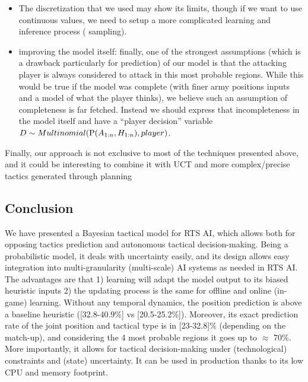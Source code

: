\begin{itemize}
    \item The discretization that we used may show its limits, though if we want to use continuous values, we need to setup a more complicated learning and inference process ( sampling).
    \item improving the model itself: finally, one of the strongest assumptions (which is a drawback particularly for prediction) of our model is that the attacking player is always considered to attack in this most probable regions. While this would be true if the model was complete (with finer army positions inputs and a model of what the player thinks), we believe such an assumption of completeness is far fetched. Instead we should express that incompleteness in the model itself and have a ``player decision'' variable $D \sim Multinomial(\mathrm{P}(A_{1:n},H_{1:n}),player)$.
\end{itemize} 

Finally, our approach is not exclusive to most of the techniques presented above, and it could be interesting to combine it with UCT \citep{UCT} and more complex/precise tactics generated through planning \citep{Chung05}

\subsection{Conclusion}


We have presented a Bayesian tactical model for RTS AI, which allows both for opposing tactics prediction and autonomous tactical decision-making. Being a probabilistic model, it deals with uncertainty easily, and its design allows easy integration into multi-granularity (multi-scale) AI systems as needed in RTS AI. The advantages are that 1) learning will adapt the model output to its biased heuristic inputs %
2) the updating process is the same for offline and online (in-game) learning. 
Without any temporal dynamics, the position prediction is above a baseline heuristic ([32.8-40.9\%] vs [20.5-25.2\%]). Moreover, its exact prediction rate of the joint position and tactical type is in [23-32.8]\% (depending on the match-up), and considering the 4 most probable regions it goes up to $\approx$ 70\%. More importantly, it allows for tactical decision-making under (technological) constraints and (state) uncertainty. It can be used in production thanks to its low CPU and memory footprint. %

